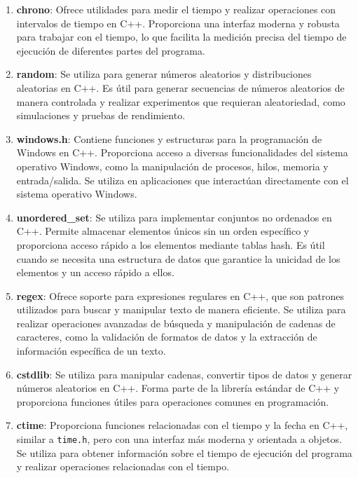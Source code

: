 \documentclass{article}
\begin{document}
\begin{enumerate}
            \item \textbf{chrono}: Ofrece utilidades para medir el tiempo y realizar operaciones con intervalos de tiempo en C++.
            Proporciona una interfaz moderna y robusta para trabajar con el tiempo, lo que facilita la medición precisa del tiempo de
            ejecución de diferentes partes del programa.

            \item \textbf{random}: Se utiliza para generar números aleatorios y distribuciones aleatorias en C++. Es útil para generar
            secuencias de números aleatorios de manera controlada y realizar experimentos que requieran aleatoriedad, como simulaciones y pruebas de rendimiento.

            \item \textbf{windows.h}: Contiene funciones y estructuras para la programación de Windows en C++. Proporciona acceso a
            diversas funcionalidades del sistema operativo Windows, como la manipulación de procesos, hilos, memoria y entrada/salida.
            Se utiliza en aplicaciones que interactúan directamente con el sistema operativo Windows.

            \item \textbf{unordered\_set}: Se utiliza para implementar conjuntos no ordenados en C++. Permite almacenar elementos
            únicos sin un orden específico y proporciona acceso rápido a los elementos mediante tablas hash. Es útil cuando se
            necesita una estructura de datos que garantice la unicidad de los elementos y un acceso rápido a ellos.

            \item \textbf{regex}: Ofrece soporte para expresiones regulares en C++, que son patrones utilizados para buscar y
            manipular texto de manera eficiente. Se utiliza para realizar operaciones avanzadas de búsqueda y manipulación de cadenas
            de caracteres, como la validación de formatos de datos y la extracción de información específica de un texto.

            \item \textbf{cstdlib}: Se utiliza para manipular cadenas, convertir tipos de datos y generar números aleatorios en C++.
            Forma parte de la librería estándar de C++ y proporciona funciones útiles para operaciones comunes en programación.

            \item \textbf{ctime}: Proporciona funciones relacionadas con el tiempo y la fecha en C++, similar a \texttt{time.h}, pero
            con una interfaz más moderna y orientada a objetos. Se utiliza para obtener información sobre el tiempo de ejecución del
            programa y realizar operaciones relacionadas con el tiempo.


\end{enumerate}
\end{document}
